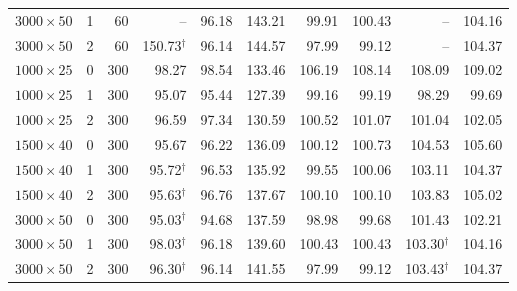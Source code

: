 \begin{table}[H]
\begin{tabular}{lrrrrrrrrr}
$3000\times50$ & 1 & 60 & -- & 96.18 & 143.21 & 99.91 & 100.43 & -- & 104.16\\
$3000\times50$ & 2 & 60 & 150.73$^\dagger$ & 96.14 & 144.57 & 97.99 & 99.12 & -- & 104.37\\
$1000\times25$ & 0 & 300 & 98.27 & 98.54 & 133.46 & 106.19 & 108.14 & 108.09 & 109.02\\
$1000\times25$ & 1 & 300 & 95.07 & 95.44 & 127.39 & 99.16 & 99.19 & 98.29 & 99.69\\
$1000\times25$ & 2 & 300 & 96.59 & 97.34 & 130.59 & 100.52 & 101.07 & 101.04 & 102.05\\
$1500\times40$ & 0 & 300 & 95.67 & 96.22 & 136.09 & 100.12 & 100.73 & 104.53 & 105.60\\
$1500\times40$ & 1 & 300 & 95.72$^\dagger$ & 96.53 & 135.92 & 99.55 & 100.06 & 103.11 & 104.37\\
$1500\times40$ & 2 & 300 & 95.63$^\dagger$ & 96.76 & 137.67 & 100.10 & 100.10 & 103.83 & 105.02\\
$3000\times50$ & 0 & 300 & 95.03$^\dagger$ & 94.68 & 137.59 & 98.98 & 99.68 & 101.43 & 102.21\\
$3000\times50$ & 1 & 300 & 98.03$^\dagger$ & 96.18 & 139.60 & 100.43 & 100.43 & 103.30$^\dagger$ & 104.16\\
$3000\times50$ & 2 & 300 & 96.30$^\dagger$ & 96.14 & 141.55 & 97.99 & 99.12 & 103.43$^\dagger$ & 104.37\\
\bottomrule
\end{tabular}
\end{table}
